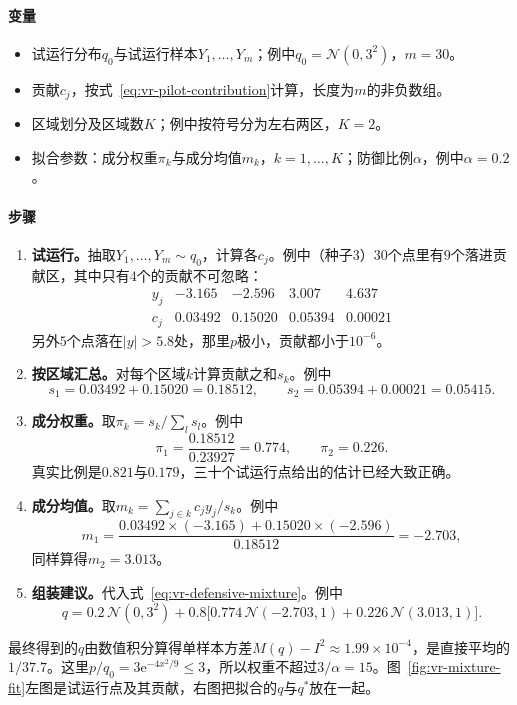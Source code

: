 \paragraph{变量}
\begin{itemize}
 \item 试运行分布$q_0$与试运行样本$Y_1,\dots,Y_m$；例中$q_0=\mathcal{N}(0,3^2)$，$m=30$。
 \item 贡献$c_j$，按式~\eqref{eq:vr-pilot-contribution}计算，长度为$m$的非负数组。
 \item 区域划分及区域数$K$；例中按符号分为左右两区，$K=2$。
 \item 拟合参数：成分权重$\pi_k$与成分均值$m_k$，$k=1,\dots,K$；防御比例$\alpha$，例中$\alpha=0.2$。
\end{itemize}

\paragraph{步骤}
\begin{enumerate}
 \item \textbf{试运行。}抽取$Y_1,\dots,Y_m\sim q_0$，计算各$c_j$。例中（种子3）$30$个点里有$9$个落进贡献区，其中只有$4$个的贡献不可忽略：
 \[
 \begin{array}{lcccc}
  y_j & -3.165 & -2.596 & 3.007 & 4.637\\
  c_j & 0.03492 & 0.15020 & 0.05394 & 0.00021
 \end{array}
 \]
 另外$5$个点落在$\lvert y\rvert>5.8$处，那里$p$极小，贡献都小于$10^{-6}$。

 \item \textbf{按区域汇总。}对每个区域$k$计算贡献之和$s_k$。例中
 \[
  s_1=0.03492+0.15020=0.18512,\qquad s_2=0.05394+0.00021=0.05415 .
 \]

 \item \textbf{成分权重。}取$\pi_k=s_k/\sum_l s_l$。例中
 \[
  \pi_1=\frac{0.18512}{0.23927}=0.774,\qquad \pi_2=0.226 .
 \]
 真实比例是$0.821$与$0.179$，三十个试运行点给出的估计已经大致正确。

 \item \textbf{成分均值。}取$m_k=\sum_{j\in k}c_jy_j/s_k$。例中
 \[
  m_1=\frac{0.03492\times(-3.165)+0.15020\times(-2.596)}{0.18512}=-2.703 ,
 \]
 同样算得$m_2=3.013$。

 \item \textbf{组装建议。}代入式~\eqref{eq:vr-defensive-mixture}。例中
 \[
  q=0.2\,\mathcal{N}(0,3^2)+0.8\bigl[0.774\,\mathcal{N}(-2.703,1)+0.226\,\mathcal{N}(3.013,1)\bigr] .
 \]
\end{enumerate}
最终得到的$q$由数值积分算得单样本方差$M(q)-I^2\approx1.99\times10^{-4}$，是直接平均的$1/37.7$。这里$p/q_0=3\mathrm{e}^{-4x^2/9}\leq3$，所以权重不超过$3/\alpha=15$。图~\ref{fig:vr-mixture-fit}左图是试运行点及其贡献，右图把拟合的$q$与$q^{*}$放在一起。

